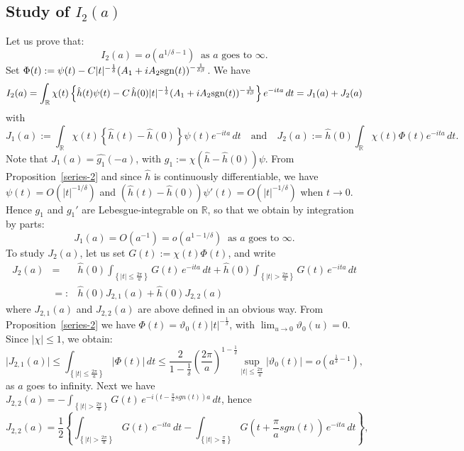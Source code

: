 \documentclass[oneside, a4paper,11pt,reqno]{amsart}
\begin{document}
\subsection{Study of $I_2(a)$}
Let us prove that:  
$$I_2(a) = o(a^{1/\delta-1})\ \mbox{ as }a\mbox{ goes to }
\infty. $$
Set $\Phi(t):=\psi(t)-C|t|^{-\frac 1\delta}(A_1+iA_2\text{\rm sgn}(t))^{-\frac 1{\delta\beta}}$. 
We have
$$I_2(a) = \int_{\mathbb R} \chi(t)\left\{\hat h(t)\psi(t) 
     - C\, \hat h(0) |t|^{-\frac 1\delta}   (A_1+iA_2\text{\rm sgn}(t))^{-\frac 1{\delta\beta}}\right\}   e^{-i ta}
  \, dt =  J_1(a)+J_2(a)$$
with
$$J_1(a):=\int_{\mathbb R} \chi(t)\left\{\hat h(t)-\hat h(0)\right\}\psi(t)e^{-ita}\, dt 
\quad  \mbox{and}\quad J_2(a):=\hat h(0) \int_{\mathbb R}  \chi(t)\Phi(t)
 e^{-i ta}  \, dt.$$
Note that $J_1(a) = \widehat{g_1}(-a)$, with $g_1 := \chi(\hat h-\hat h(0))\psi$. From Proposition~\ref{series-2} and since $\hat h$ is 
continuously differentiable, we have $\psi(t) = O(|t|^{-1/\delta})$ and $(\hat h(t)-\hat h(0))\psi'(t) = O(|t|^{-1/\delta})$ when $t\rightarrow 0$. Hence $g_1$ and $g_1'$ are Lebesgue-integrable on ${\mathbb R}$, so that we obtain by integration by parts: 
$$J_1(a)=O(a^{-1}) = o(a^{1-1/\delta})\ \mbox{ as }a\mbox{ goes to }
\infty. $$
To study $J_2(a)$, let us set $G(t) := \chi(t)\Phi(t)$, and write 
\begin{eqnarray}
J_2(a) &=& \hat h(0)\int_{\left\{|t| \leq \frac{2\pi}{a}\right\}}
    G(t)\, e^{-ita}\, dt + \hat h(0)
  \int_{\left\{|t|>\frac{2\pi}{a}\right\}} G(t)\, e^{-ita}\, dt  \nonumber \\ 
&=:& \hat h(0)J_{2,1}(a) + \hat h(0)J_{2,2}(a) \label{j2a-sum}
\end{eqnarray}
where $J_{2,1}(a)$ and $J_{2,2}(a)$ are above defined in an obvious way. From Proposition~\ref{series-2} we have $\Phi(t)=\vartheta_0(t)|t|^{-\frac 1\delta}$, with $\lim_{u\rightarrow 0}\vartheta_0(u)=0$. Since $|\chi| \leq 1$, we obtain: 
\begin{equation}\label{int1} 
\big|J_{2,1}(a)\big| \leq \int_{\left\{|t| \leq \frac{2\pi}{a}\right\}}
    \big|\Phi(t)\big|\, dt \leq \frac {2}{1-\frac 1\delta} \left(\frac{2\pi}{a}\right)^{1-\frac 1\delta} 
    \sup_{|t|\leq \frac{2\pi}{a}} |\vartheta_0(t)|  = o(a^{\frac 1\delta -1}),
\end{equation}
as $a$ goes to infinity. 
Next we have $J_{2,2}(a) =  -\int_{\left\{|t| > \frac{2\pi}{a}\right\}} 
  G(t)\,  e^{-i\left(t-\frac{\pi}{a}sgn(t)\right)a}\, dt$, hence 
$$J_{2,2}(a) = \frac 1 2 \left\{\int_{\left\{|t| > \frac{2\pi}{a}\right\}} G(t)\, e^{-ita}\, dt -
     \int_{\left\{|t| > \frac{\pi}{a}\right\}} 
      G\left(t+\frac \pi {a}sgn(t)\right)\, 
   e^{-ita}\, dt\right\},$$
\end{document}
